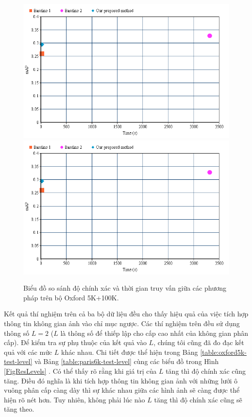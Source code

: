 \begin{figure}[!htbp]
  \begin{center}
    \leavevmode
    \ifpdf
      \includegraphics[scale=0.45]{1_chart}
    \else
      \includegraphics[scale=0.45]{1_chart}
    \fi
    \caption[Biểu đồ so sánh độ chính xác và thời gian truy vấn giữa các phương pháp]{Biểu đồ so sánh độ chính xác và thời gian truy vấn giữa các phương pháp trên bộ Oxford 5K+100K.}
    \label{Fig1Chart}
  \end{center}
\end{figure}

Kết quả thí nghiệm trên cả ba bộ dữ liệu đều cho thấy hiệu quả của việc tích hợp thông tin không gian ảnh vào chỉ mục ngược. Các thí nghiệm trên đều sử dụng thông số $L = 2$ ($L$ là thông số để thiếp lập cho cấp cao nhất của không gian phân cấp). Để kiểm tra sự phụ thuộc của kết quả vào $L$, chúng tôi cũng đã đo đạc kết quả với các mức $L$ khác nhau. Chi tiết được thể hiện trong Bảng \ref{table:oxford5k-test-level} và Bảng \ref{table:paris6k-test-level} cùng các biểu đồ trong Hình \ref{FigResLevels} . Có thể thấy rõ rằng khi giá trị của $L$ tăng thì độ chính xác cũng tăng. Điều đó nghĩa là khi tích hợp thông tin không gian ảnh với những lưới ô vuông phân cấp càng dày thì sự khác nhau giữa các hình ảnh sẽ càng được thể hiện rõ nét hơn. Tuy nhiên, không phải lúc nào $L$ tăng thì độ chính xác cũng sẽ tăng theo.

